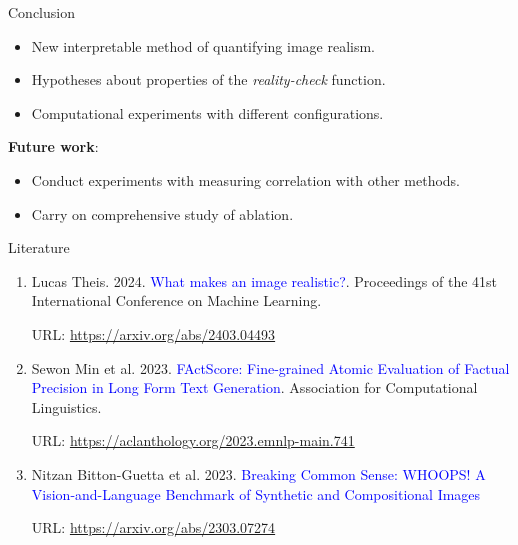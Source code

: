 \documentclass{beamer}
\begin{document}
\begin{frame}{Conclusion}
  \begin{itemize}
      \item New interpretable method of quantifying image realism.
      \item Hypotheses about properties of the \textit{reality-check} function.
      \item Computational experiments with different configurations.
  \end{itemize}

  \textbf{Future work}: 
  \begin{itemize}
      \item Conduct experiments with measuring correlation with other methods.
      \item Carry on comprehensive study of ablation.
  \end{itemize}
\end{frame}

\begin{frame}{Literature}
\begin{enumerate}
    \item Lucas Theis. 2024. \textcolor{blue}{What makes an image realistic?}. Proceedings of the 41st International Conference on Machine Learning.

    URL: \url{https://arxiv.org/abs/2403.04493}

    \item Sewon Min et al. 2023. \textcolor{blue}{{FA}ct{S}core: Fine-grained Atomic Evaluation of Factual Precision in Long Form Text Generation}. Association for Computational Linguistics.

    URL: \url{https://aclanthology.org/2023.emnlp-main.741}

    \item Nitzan Bitton-Guetta et al. 2023. \textcolor{blue}{Breaking Common Sense: WHOOPS! A Vision-and-Language Benchmark of Synthetic and Compositional Images}

    URL: \url{https://arxiv.org/abs/2303.07274}

  \end{enumerate}
\end{frame}
\end{document}
